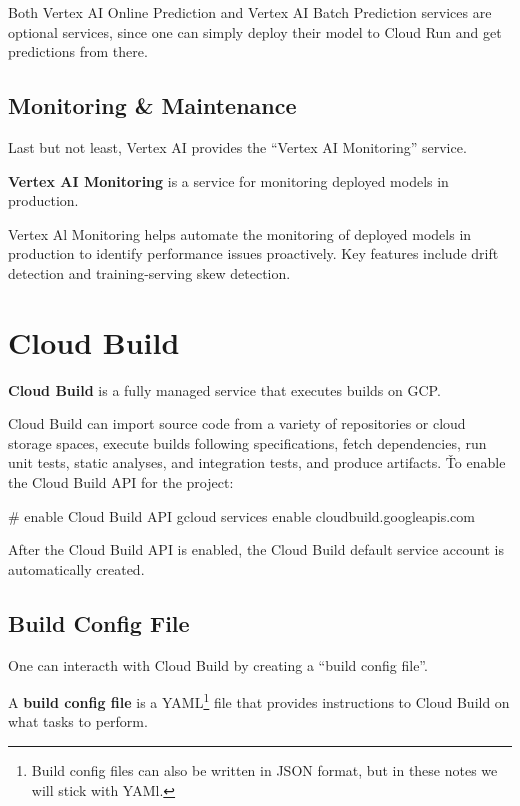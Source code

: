 Both Vertex AI Online Prediction and Vertex AI Batch Prediction services are optional services, since one can simply
deploy their model to Cloud Run and get predictions from there.

\subsection{Monitoring \& Maintenance}

Last but not least, Vertex AI provides the ``Vertex AI Monitoring'' service.

\textbf{Vertex AI Monitoring} is a service for monitoring deployed models in production.
\ed

Vertex Al Monitoring helps automate the monitoring of deployed models in production to identify performance issues
proactively. Key features include drift detection and training-serving skew detection.

\section{Cloud Build}\label{sec:cloud_build}

\textbf{Cloud Build} is a fully managed service that executes builds on GCP\@.
\ed

Cloud Build can import source code from a variety of repositories or cloud storage spaces, execute builds following
specifications, fetch dependencies, run unit tests, static analyses, and integration tests, and produce artifacts. \v

To enable the Cloud Build API for the project:
\begin{bash}
# enable Cloud Build API
gcloud services enable cloudbuild.googleapis.com
\end{bash}

After the Cloud Build API is enabled, the Cloud Build default service account is automatically created.

\subsection{Build Config File}

One can interacth with Cloud Build by creating a ``build config file''.

A \textbf{build config file} is a YAML\footnote{Build config files can also be written in JSON format, but in these
notes we will stick with YAMl.} file that provides instructions to Cloud Build on what tasks to perform.
\ed

